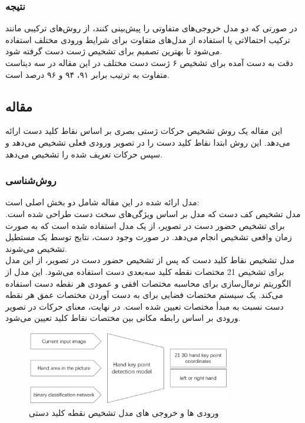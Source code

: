 \subsubsection{نتیجه}
در صورتی که دو مدل خروجی‌های متفاوتی را پیش‌بینی کنند، از روش‌های ترکیبی مانند ترکیب احتمالاتی یا استفاده از مدل‌های متفاوت برای شرایط ورودی مختلف استفاده می‌شود تا بهترین تصمیم برای تشخیص ژست دست گرفته شود.
\\
دقت به دست آمده برای تشخیص ۶ ژست دست مختلف در این مقاله در سه دیتاست متفاوت به ترتیب برابر ۹۱، ۹۴ و ۹۶ درصد است.


\cite{dang2022improved}


\subsection{مقاله }
این مقاله یک روش تشخیص حرکات ژستی بصری بر اساس نقاط کلید دست ارائه می‌دهد. این روش ابتدا نقاط کلید دست را در تصویر ورودی فعلی تشخیص می‌دهد و سپس حرکات تعریف شده را تشخیص می‌دهد.

\subsubsection{روش‌شناسی}
مدل ارائه شده در این مقاله شامل دو بخش اصلی است: 
\\
مدل تشخیص کف دست که مدل بر اساس ویژگی‌های سخت دست طراحی شده است. برای تشخیص حضور دست در تصویر، از یک مدل  استفاده شده است که به صورت زمان
واقعی تشخیص انجام می‌دهد. در صورت وجود دست، نتایج توسط یک مستطیل تشخیص می‌شوند.
\\
مدل تشخیص نقاط کلید دست که پس از تشخیص حضور دست در تصویر، از این مدل برای تشخیص 21 مختصات نقطه کلید سه‌بعدی دست استفاده می‌شود.  این مدل از الگوریتم نرمال‌سازی برای محاسبه مختصات افقی و عمودی هر نقطه 
دست استفاده می‌کند. یک سیستم مختصات فضایی برای به دست آوردن مختصات عمق هر نقطه دست نسبت به مبدأ مختصات تعیین شده است. در نهایت، معنای حرکات در تصویر ورودی بر اساس رابطه مکانی بین مختصات نقاط کلید تعیین می‌شود.

\begin{figure}[h]
    \centering
    \includegraphics[width=0.8\textwidth]{keypoint.png}
    \caption{ورودی ها و خروجی های مدل تشخیص نقطه کلید دستی}
\end{figure}

